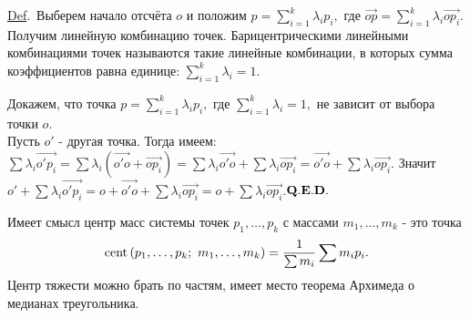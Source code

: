 \documentclass[a4paper]{article}%
\renewcommand{\de}{\par\noindent\underline{Def}.\ }%
\renewcommand{\ab}{\par\noindent}%
\newcommand{\qed}{\quad${{\bf Q.E.D.}}$}
\newcommand{\rom}[1]{{\rm#1\,}}
\newcommand{\oi}[1]{\overrightarrow{#1}}%
\begin{document}
\de Выберем начало отсчёта $o$ и положим $p=\sum\limits_{i=1}^k\lambda_ip_i,$ где
$\oi{op}=\sum\limits_{i=1}^k\lambda_i\oi{op_i}.$ Получим линейную комбинацию точек. Барицентрическими
линейными комбинациями точек называются такие линейные комбинации, в которых сумма коэффициентов равна единице:
$\sum\limits_{i=1}^k\lambda_i=1.$ %
\ab Докажем, что точка $p=\sum\limits_{i=1}^k\lambda_ip_i,$ где $\sum\limits_{i=1}^k\lambda_i=1,$ не зависит от
выбора точки $o$.\\ Пусть $o'$ - другая точка. Тогда имеем: \
$\sum\lambda_i\oi{o'p_i}=\sum\lambda_i(\oi{o'o}+\oi{op_i})=\sum\lambda_i\oi{o'o}+\sum\lambda_i\oi{op_i}=\oi{o'o}+\sum\lambda_i\oi{op_i}.$
Значит\ \  $o'+\sum\lambda_i\oi{o'p_i}=o+\oi{o'o}+\sum\lambda_i\oi{op_i}=o+\sum\lambda_i\oi{op_i}.$\qquad\qed %
\ab Имеет смысл центр масс системы точек $p_1,\dots,p_k$ с массами $m_1,\dots,m_k$ - это точка
$$
\rom{cent}(p_1,\dots,p_k;\ m_1,\dots,m_k)=\frac{1}{\sum m_i}\sum m_ip_i.
$$
Центр тяжести можно брать по частям, имеет место теорема Архимеда о медианах треугольника.
\end{document}
